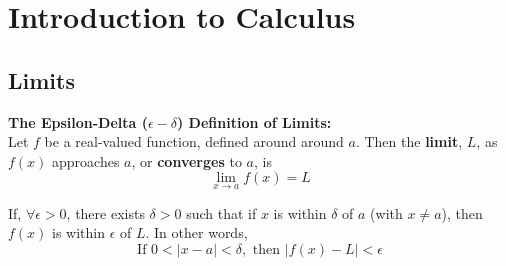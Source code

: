 \section{Introduction to Calculus}

    \subsection{Limits}
        \color{purple} \textbf{The Epsilon-Delta ($\epsilon-\delta$) Definition of Limits:}
        \color{black} \\

        \noindent Let $f$ be a real-valued function, defined around around $a$.
        Then the \textbf{limit}, $L$, as $f(x)$ approaches $a$, or \textbf{converges} to $a$, is \\

        \begin{equation*}
            \lim_{x \to a} f(x) = L
        \end{equation*}

        \noindent If, $\forall \epsilon > 0$, there exists $\delta > 0$ such that if $x$ is
        within $\delta$ of $a$ (with $x\not = a$), then $f(x)$ is within $\epsilon$ of $L$.
        In other words, \\

        \begin{equation*}
            \text{If } 0 < |x-a| < \delta, \text{ then } |f(x)-L| < \epsilon
        \end{equation*}

